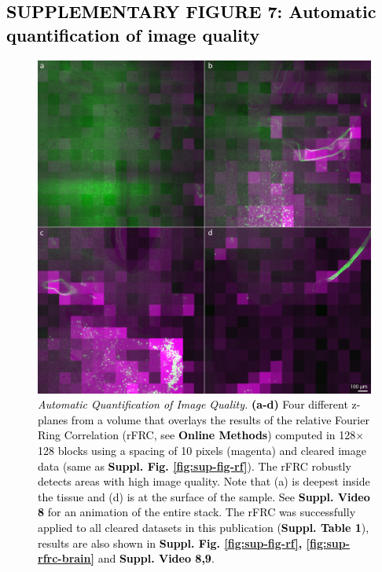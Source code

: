\documentclass[]{spie}  %
\def\red{\textcolor{black}}
\begin{document}
\subsection*{\red{SUPPLEMENTARY FIGURE 7: Automatic quantification of image quality}}
\vspace{1mm}
\begin{figure}[h!]
\includegraphics[width=\textwidth]{rFRC.jpg}
\vspace{-2.0mm}
\caption{\hspace{-0.5mm} \red{\emph{Automatic Quantification of Image Quality.} \textbf{(a-d)} Four different z-planes from a volume that overlays the results of the relative Fourier Ring Correlation (rFRC, see \textbf{Online Methods}) computed in 128$\times$128 blocks using a spacing of 10 pixels (magenta) and cleared image data (same as \textbf{Suppl. Fig. \ref{fig:sup-fig-rf}}). The rFRC robustly detects areas with high image quality. Note that (a) is deepest inside the tissue and (d) is at the surface of the sample. See \textbf{Suppl. Video 8} for an animation of the entire stack. The rFRC was successfully applied to all cleared datasets in this publication (\textbf{Suppl. Table 1}), results are also shown in \textbf{Suppl. Fig. \ref{fig:sup-fig-rf}, \ref{fig:sup-rfrc-brain}} and \textbf{Suppl. Video 8,9}.
}}
\label{fig:sup-rFRC}
\end{figure}
\end{document}
